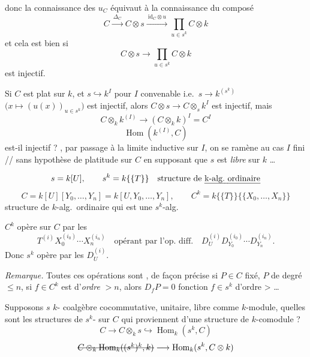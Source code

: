 \documentclass[11pt,a4paper]{article}
\begin{document}

donc la connaissance des $u_C$ équivaut à la connaissance du composé
\[
  C \xrightarrow{\ \Delta_C\ } C \otimes s \xrightarrow{\ \mathrm{id}_C \otimes u\ } \prod_{u \in s^k} C \otimes k
\]
et cela est bien si
\[
  C \otimes s \longrightarrow \prod_{u \in s^k} C \otimes k
\]
est injectif.

Si $C$ est plat sur $k$, et $s \hookrightarrow k^I$ pour $I$ convenable
i.e.\ $s \to k^{(s^k)}$ $\bigl(x \mapsto (u(x))_{u \in s^k}\bigr)$ est injectif,
alors $C \otimes s \to C \otimes_s k^I$ est injectif, mais
\[
  C \otimes_k k^{(I)} \longrightarrow (C \otimes_k k)^I = C^I
\]
\[
  \operatorname{Hom}(k^{(I)}, C)
\]
est-il injectif ? , par passage à la limite inductive sur $I$, on se ramène au cas $I$ fini // \ill{}  sans hypothèse de platitude sur $C$ en supposant que $s$ est \emph{libre} sur $k$ …

\[
  s = k[U] , \qquad s^k = k\{\{T\}\} \quad \text{structure de \uncertain{k-alg.\ ordinaire}}
\]
\[
  C = k[U][Y_0, \ldots, Y_n] = k[U, Y_0, \ldots, Y_n] , \qquad C^k = k\{\{T\}\}\{\{X_0, \ldots, X_n\}\}
\]
structure de $k$-alg.\ ordinaire qui est une $s^k$-alg.

$C^k$ opère sur $C$ par les
\[
  T^{(i)} X_0^{(i_0)} \cdots X_n^{(i_n)} \quad \text{opérant par l'op.\ diff.} \quad D_U^{(i)} D_{Y_0}^{(i_0)} \cdots D_{Y_n}^{(i_n)} .
\]
 Donc $s^k$ opère par les $D_U^{(i)}$.

\emph{Remarque.} Toutes ces opérations sont   , de façon précise si $P \in C$ fixé, $P$ de degré $\leqslant n$, si $f \in C^k$ est d'\emph{ordre} $> n$, alors $D_f P = 0$ \ill{} fonction \ill{} $f \in s^k$ d’ordre > …

Supposons $s$ $k$-\struck{\ill{}} coalgèbre cocommutative, unitaire, libre comme $k$-module, quelles sont les structures de $s^k$- sur  $C$ qui proviennent d'une structure de $k$-comodule ? 
\[
  C \longrightarrow C \otimes_k s \hookrightarrow \operatorname{Hom}_k(s^k, C)
\]
\[
  \text{\struck{$C \otimes_k \operatorname{Hom}_k((s^k)^k, k)$}} \longrightarrow \operatorname{Hom}_k(s^k, C \otimes k)
\]
\end{document}

